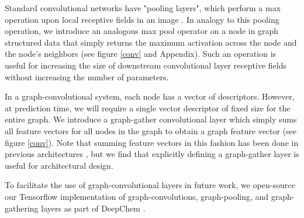 Standard convolutional networks have "pooling layers", which perform a max operation upon local receptive fields in an image \cite{karpathy231n}. In analogy to this pooling operation, we introduce an analogous max pool operator on a node in graph structured data that simply returns the maximum activation across the node and the node's neighbors (see figure \ref{conv} and Appendix). Such an operation is useful for increasing the size of downstream convolutional layer receptive fields without increasing the number of parameters.

In a graph-convolutional system, each node has a vector of descriptors. However, at prediction time, we will require a single vector descriptor of fixed size for the entire graph. We introduce a graph-gather convolutional layer which simply sums all feature vectors for all nodes in the graph to obtain a graph feature vector (see figure \ref{conv}). Note that summing feature vectors in this fashion has been done in previous architectures \cite{duvenaud2015convolutional}, but we find that explicitly defining a graph-gather layer is useful for architectural design.


To facilitate the use of graph-convolutional layers in future work, we open-source our Tensorflow\cite{abadi2016tensorflow} implementation of graph-convolutions, graph-pooling, and graph-gathering layers as part of DeepChem \cite{ram2016}.

